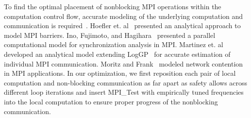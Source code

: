 To find the optimal placement of nonblocking MPI operations within the computation control flow,
accurate modeling of the underlying computation and communication is required~\cite{brightwell:ics04}.
Hoefler et. al~\cite{hoefler:icppw05} presented an analytical approach to model MPI barriers.
Ino,  Fujimoto, and Hagihara~\cite{ino:ppopp2001} presented a parallel computational model for synchronization analysis in MPI.
Martinez et. al~\cite{martinez:ipdps09} developed an analytical model extending LogGP~\cite{loggp} for accurate estimation of individual MPI communication.
Moritz and Frank~\cite{moritz:tpds01} modeled network contention in MPI applications.
In our optimization,
  we first reposition each pair of local computation and non-blocking communication as far apart as safety allows across different loop iterations and insert MPI\_Test with empirically tuned frequencies into the local computation to ensure proper progress of the nonblocking communication. 


